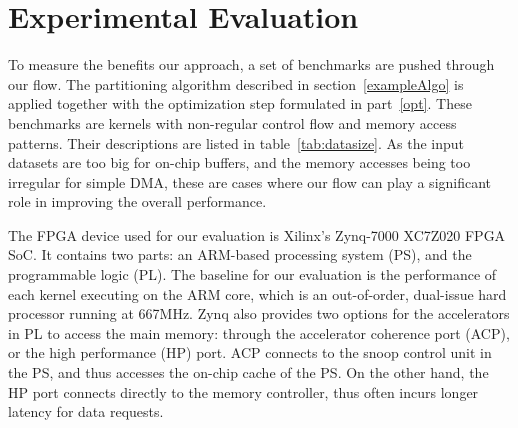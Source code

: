 \documentclass{sig-alternate}
\begin{document}
\begin{algorithm}[t]
\begin{algorithmic}[1]
  
  
  \end{algorithmic}
\end{algorithm}

\section{Experimental Evaluation}
\label{expEval}
To measure the benefits our approach, a set of benchmarks are pushed through our flow. The partitioning algorithm described in section~\ref{exampleAlgo} is applied together with the optimization step formulated in part~\ref{opt}. These benchmarks are kernels with non-regular control flow and memory access patterns. Their descriptions are listed in table~\ref{tab:datasize}. 
As the input datasets are too big for on-chip buffers, and the memory accesses
being too irregular for simple DMA, these are cases where our flow can play a significant role
in improving the overall performance.







The FPGA device used for our evaluation is Xilinx's Zynq-7000 XC7Z020 FPGA
SoC. It contains two parts: an ARM-based processing
system (PS), and the programmable logic (PL). 
The baseline for our evaluation is the performance of each kernel executing
on the ARM core, which is an out-of-order, dual-issue hard processor running at 667MHz. Zynq also provides two
options for the accelerators in PL to access the main memory: 
through the accelerator coherence port (ACP), or the high performance (HP) port. 
ACP connects to the snoop control unit in the PS, and 
thus accesses the on-chip cache of the PS. On the other hand, the HP port connects
directly to the memory controller, thus often incurs longer latency
for data requests.
\end{document}
